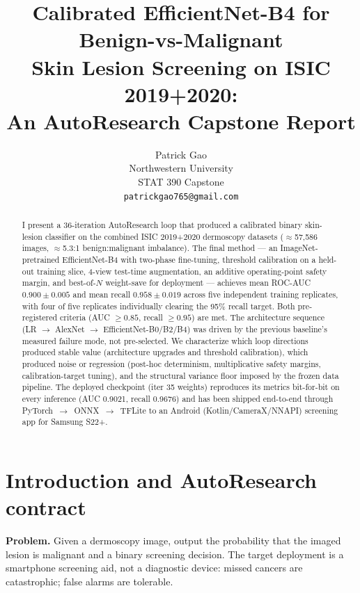 \documentclass{article}
\title{Calibrated EfficientNet-B4 for Benign-vs-Malignant\\
       Skin Lesion Screening on ISIC 2019+2020:\\
       An AutoResearch Capstone Report}
\author{%
  Patrick Gao \\
  Northwestern University \\
  STAT 390 Capstone \\
  \texttt{patrickgao765@gmail.com} \\
}
\begin{document}
\maketitle

\begin{abstract}
I present a 36-iteration AutoResearch loop that produced a calibrated
binary skin-lesion classifier on the combined ISIC 2019+2020 dermoscopy
datasets ($\approx$57,586 images, $\approx$5.3:1 benign:malignant imbalance).
The final method --- an ImageNet-pretrained EfficientNet-B4 with two-phase
fine-tuning, threshold calibration on a held-out training slice, 4-view
test-time augmentation, an additive operating-point safety margin, and
best-of-$N$ weight-save for deployment --- achieves mean ROC-AUC
$0.900 \pm 0.005$ and mean recall $0.958 \pm 0.019$ across five
independent training replicates, with four of five replicates individually
clearing the 95\% recall target. Both pre-registered criteria
(AUC $\ge 0.85$, recall $\ge 0.95$) are met. The architecture sequence
(LR $\to$ AlexNet $\to$ EfficientNet-B0/B2/B4) was driven by the previous
baseline's measured failure mode, not pre-selected. We characterize which
loop directions produced stable value (architecture upgrades and threshold
calibration), which produced noise or regression (post-hoc determinism,
multiplicative safety margins, calibration-target tuning), and the
structural variance floor imposed by the frozen data pipeline. The
deployed checkpoint (iter 35 weights) reproduces its metrics bit-for-bit
on every inference (AUC 0.9021, recall 0.9676) and has been shipped
end-to-end through PyTorch~$\to$~ONNX~$\to$~TFLite to an Android
(Kotlin/CameraX/NNAPI) screening app for Samsung S22+.
\end{abstract}

\section{Introduction and AutoResearch contract}

\textbf{Problem.} Given a dermoscopy image, output the probability that
the imaged lesion is malignant and a binary screening decision. The
target deployment is a smartphone screening aid, not a diagnostic device:
missed cancers are catastrophic; false alarms are tolerable.
\end{document}
